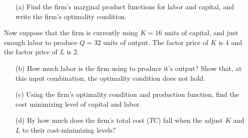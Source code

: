 \documentclass[11pt]{article}
\begin{document}
\begin{enumerate}
  \begin{enumerate}
    \item[(a)] Find the firm’s marginal product functions for labor and capital, and write the firm’s optimality condition.
  \end{enumerate}


  \vspace*{60mm}
  Now suppose that the firm is currently using $K = 16$ units of capital, and just enough labor to produce $Q = 32$ units of output. The factor price of $K$ is 4 and the factor price of $L$ is 2.

  \begin{enumerate}
    \item[(b)] How much labor is the firm using to produce it’s output? Show that, at this input combination, the optimality condition does not hold.

    \newpage
    \item[(c)] Using the firm’s optimality condition and production function, find the cost minimizing level of capital and labor.

    \vspace*{100mm}
    \item[(d)] By how much does the firm’s total cost ($TC$) fall when the adjust $K$ and $L$ to their cost-minimizing levels?
  \end{enumerate}


\end{enumerate}
\end{document}
